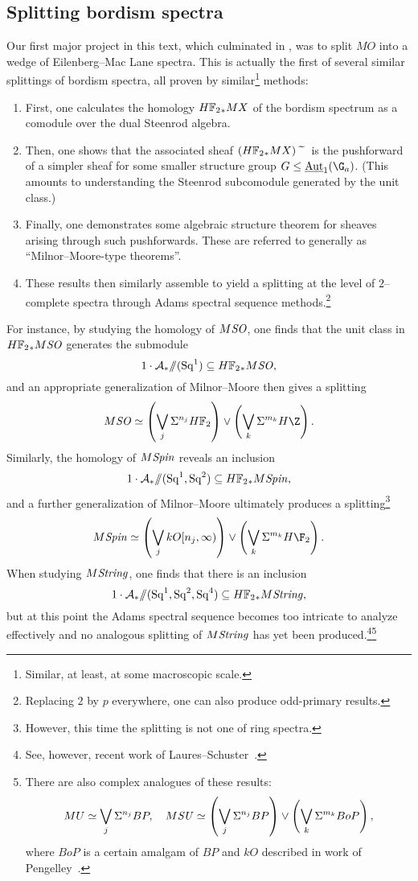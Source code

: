 \subsection*{Splitting bordism spectra}

Our first major project in this text, which culminated in , was to split \(MO\) into a wedge of Eilenberg--Mac Lane spectra.  This is actually the first of several similar splittings of bordism spectra, all proven by similar\footnote{Similar, at least, at some macroscopic scale.} methods:
\begin{enumerate}
    \item First, one calculates the homology \(\HFtwo_* MX\) of the bordism spectrum as a comodule over the dual Steenrod algebra.
    \item Then, one shows that the associated sheaf \((\HFtwo_* MX)\widetilde{\quad}\) is the pushforward of a simpler sheaf for some smaller structure group \(G \le \InternalAut_1(\G_a)\).  (This amounts to understanding the Steenrod subcomodule generated by the unit class.)
    \item Finally, one demonstrates some algebraic structure theorem for sheaves arising through such pushforwards.  These are referred to generally as ``Milnor--Moore-type theorems''.
    \item These results then similarly assemble to yield a splitting at the level of \(2\)--complete spectra through Adams spectral sequence methods.\footnote{Replacing \(2\) by \(p\) everywhere, one can also produce odd-primary results.}
\end{enumerate}

For instance, by studying the homology of \(M\mathit{SO}\), one finds that the unit class in \(\HFtwo_* M\SO\) generates the submodule~\cite[Lemma 20.38]{Switzer} \[1 \cdot \mathcal A_* \mmod (\Sq^1) \subseteq \HFtwo_* M\SO,\] and an appropriate generalization of Milnor--Moore then gives a splitting \[M\SO \simeq \left( \bigvee_j \Susp^{n_j} \HFtwo \right) \vee \left( \bigvee_k \Susp^{m_k} H\Z \right).\]  Similarly, the homology of \(M\mathit{Spin}\) reveals an inclusion~\cite{ABS,ABP,GiambalvoPengelley} \[1 \cdot \mathcal A_* \mmod (\Sq^1, \Sq^2) \subseteq \HFtwo_* M\Spin,\] and a further generalization of Milnor--Moore ultimately produces a splitting\footnote{However, this time the splitting is not one of ring spectra.} \[M\Spin \simeq \left( \bigvee_j kO[n_j, \infty)\right) \vee \left( \bigvee_k \Susp^{m_k} H\F_2 \right).\]  When studying \(M\mathit{String}\), one finds that there is an inclusion \[1 \cdot \mathcal A_* \mmod (\Sq^1, \Sq^2, \Sq^4) \subseteq \HFtwo_* M\String,\] but at this point the Adams spectral sequence becomes too intricate to analyze effectively and no analogous splitting of \(M\mathit{String}\) has yet been produced.\footnote{See, however, recent work of Laures--Schuster~\cite{LauresSchuster}.}\footnote{There are also complex analogues of these results:
\[
MU \simeq \bigvee_j \Sigma^{n_j} BP, \quad
M\mathit{SU} \simeq \left(\bigvee_j \Sigma^{n_j} BP\right) \vee \left(\bigvee_k \Sigma^{m_k} BoP \right),
\]
where \(BoP\) is a certain amalgam of \(BP\) and \(kO\) described in work of Pengelley~\cite{Pengelley}.}

